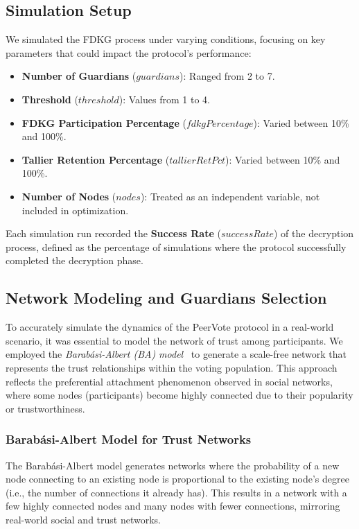 \documentclass[runningheads]{llncs}
\begin{document}
\subsection{Simulation Setup}

We simulated the FDKG process under varying conditions, focusing on key parameters that could impact the protocol's performance:

\begin{itemize} 
    \item \textbf{Number of Guardians} ($guardians$): Ranged from 2 to 7. 
    \item \textbf{Threshold} ($threshold$): Values from 1 to 4. 
    \item \textbf{FDKG Participation Percentage} ($fdkgPercentage$): Varied between 10\% and 100\%. 
    \item \textbf{Tallier Retention Percentage} ($tallierRetPct$): Varied between 10\% and 100\%. 
    \item \textbf{Number of Nodes} ($nodes$): Treated as an independent variable, not included in optimization. 
\end{itemize}

Each simulation run recorded the \textbf{Success Rate} ($successRate$) of the decryption process, defined as the percentage of simulations where the protocol successfully completed the decryption phase.

\subsection{Network Modeling and Guardians Selection}

To accurately simulate the dynamics of the PeerVote protocol in a real-world scenario, it was essential to model the network of trust among participants. We employed the \textit{Barabási-Albert (BA) model}~\cite{barabasiEmergenceScalingRandom1999} to generate a scale-free network that represents the trust relationships within the voting population. This approach reflects the preferential attachment phenomenon observed in social networks, where some nodes (participants) become highly connected due to their popularity or trustworthiness.

\subsubsection{Barabási-Albert Model for Trust Networks}

The Barabási-Albert model generates networks where the probability of a new node connecting to an existing node is proportional to the existing node's degree (i.e., the number of connections it already has). This results in a network with a few highly connected nodes and many nodes with fewer connections, mirroring real-world social and trust networks.
\end{document}
